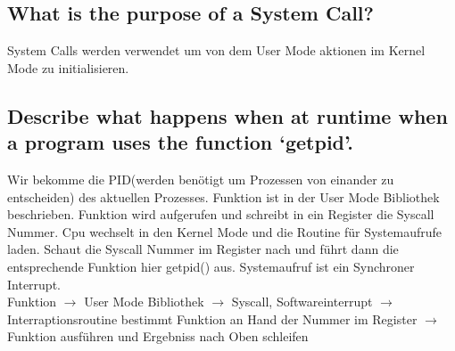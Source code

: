 %
%
%

\subsection{What is the purpose of a System Call?}
System Calls werden verwendet um von dem User Mode aktionen im Kernel Mode zu initialisieren.

\subsection{Describe what happens when at runtime when a program uses the function `getpid'.}
Wir bekomme die PID(werden ben\"otigt um Prozessen von einander zu entscheiden) des aktuellen Prozesses. Funktion ist in der User Mode Bibliothek beschrieben. Funktion wird aufgerufen und schreibt in ein Register die Syscall Nummer. Cpu wechselt in den Kernel Mode und die Routine f\"ur Systemaufrufe laden. Schaut die Syscall Nummer im Register nach und f\"uhrt dann die entsprechende Funktion hier getpid() aus. Systemaufruf ist ein Synchroner Interrupt.\\
Funktion $\rightarrow$ User Mode Bibliothek $\rightarrow$ Syscall, Softwareinterrupt $\rightarrow$ Interraptionsroutine bestimmt Funktion an Hand der Nummer im Register $\rightarrow$ Funktion ausf\"uhren und Ergebniss nach Oben schleifen

